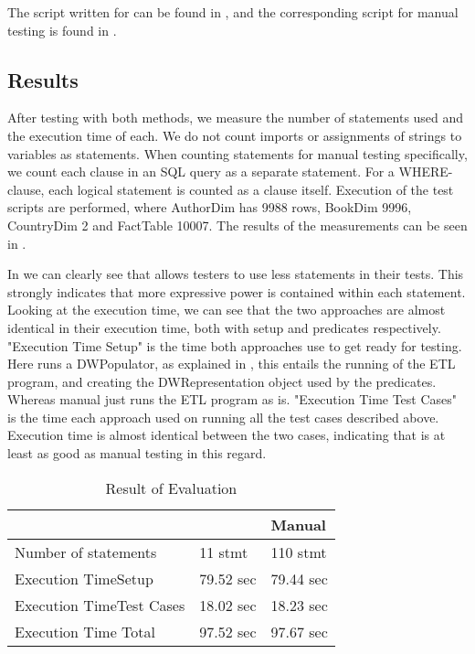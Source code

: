 The script written for \FW{} can be found in , and the corresponding script for manual testing is found in .

\subsection{Results}
After testing with both methods, we measure the number of statements used and the execution time of each. We do not count imports or assignments of strings to variables as statements. When counting statements for manual testing specifically, we count each clause in an SQL query as a separate statement. For a WHERE-clause, each logical statement is counted as a clause itself.  Execution of the test scripts  are performed, where AuthorDim has 9988 rows, BookDim 9996, CountryDim 2 and FactTable 10007. The results of the measurements can be seen in .

In  we can clearly see that \FW{} allows testers to use less statements in their tests. This strongly indicates that more expressive power is contained within each statement. Looking at the execution time, we can see that the two approaches are almost identical in their execution time, both with setup and predicates respectively. "Execution Time Setup" is the time both approaches use to get ready for testing. Here \FW{} runs a DWPopulator, as explained in , this entails the running of the ETL program, and creating the DWRepresentation object used by the predicates. Whereas manual just runs the ETL program as is. "Execution Time Test Cases" is the time each approach used on running all the test cases described above. Execution time is almost identical between the two cases, indicating that \FW{} is at least as good as manual testing in this regard.

\begin{table}[h]
\centering
\caption{Result of Evaluation}
\label{table:result}
\begin{tabular}{|p{}|p{}|p{}|}
\hline
   																			 & \FW{}   	& Manual    \\ \hline
Number of statements 									 & 11 stmt   		  & 110  stmt  	 \\ \hline
Execution Time\newline Setup   					 & 79.52 sec   & 79.44 sec  \\ \hline
Execution Time\newline Test Cases   			 & 18.02 sec   & 18.23 sec  \\ \hline
Execution Time Total   										 & 97.52 sec   & 97.67 sec  \\ \hline

\end{tabular}
\end{table}
